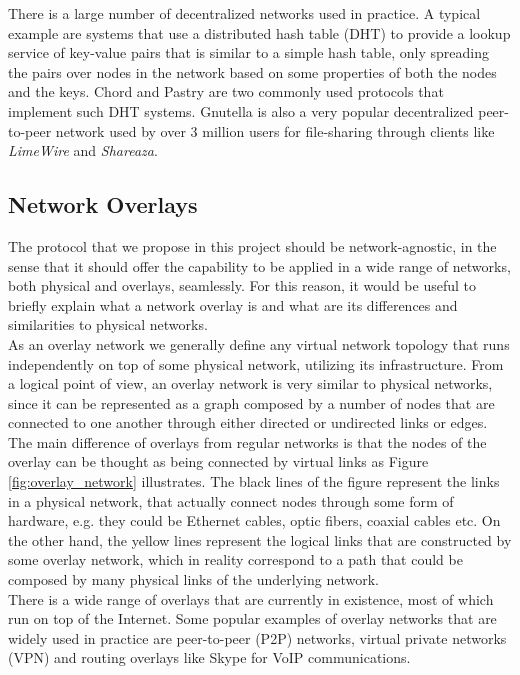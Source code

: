 \documentclass[a4paper,11pt,twoside]{report}
\begin{document}
There is a large number of decentralized networks used in practice. A typical example are systems that use a distributed hash table (DHT) to provide a lookup service of key-value pairs that is similar to a simple hash table, only spreading the pairs over nodes in the network based on some properties of both the nodes and the keys. Chord \cite{Stoica:2001:CSP:964723.383071} and Pastry \cite{Rowstron:2001:PSD:646591.697650} are two commonly used protocols that implement such DHT systems. Gnutella is also a very popular decentralized peer-to-peer network used by over 3 million users for file-sharing \cite{4146697} through clients like \textit{LimeWire} and \textit{Shareaza}.


\subsection{Network Overlays}
\label{subsec:overlay_diff}

The protocol that we propose in this project should be network-agnostic, in the sense that it should offer the capability to be applied in a wide range of networks, both physical and overlays, seamlessly. For this reason, it would be useful to briefly explain what a network overlay is and what are its differences and similarities to physical networks.\\

As an overlay network we generally define any virtual network topology that runs independently on top of some physical network, utilizing its infrastructure. From a logical point of view, an overlay network is very similar to physical networks, since it can be represented as a graph composed by a number of nodes that are connected to one another through either directed or undirected links or edges. The main difference of overlays from regular networks is that the nodes of the overlay can be thought as being connected by virtual links as Figure \ref{fig:overlay_network} illustrates. The black lines of the figure represent the links in a physical network, that actually connect nodes through some form of hardware, e.g. they could be Ethernet cables, optic fibers, coaxial cables etc. On the other hand, the yellow lines represent the logical links that are constructed by some overlay network, which in reality correspond to a path that could be composed by many physical links of the underlying network. \\

There is a wide range of overlays that are currently in existence, most of which run on top of the Internet. Some popular examples of overlay networks that are widely used in practice are peer-to-peer (P2P) networks, virtual private networks (VPN) and routing overlays like Skype for VoIP communications.  \\
\end{document}
